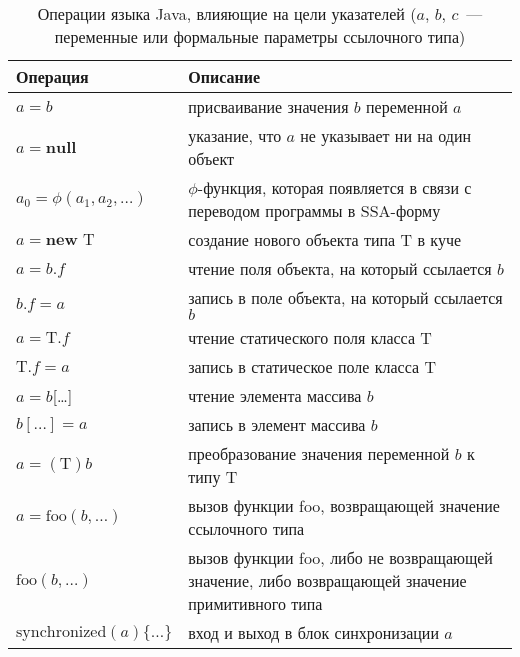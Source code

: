 \documentclass[14pt,titlepage]{extarticle}
\newcommand{\NEW}{\textbf{new }}
\newcommand{\NULL}{\textbf{null }}
\let\oldphi\phi
\renewcommand{\phi}{\ensuremath{\oldphi}}
\newcommand{\eng}[1]{{\English#1}}
\newcommand{\java}{\eng{Java}\xspace}
\begin{document}
      \begin{table}
        \centering

        \begin{tabular}{|l|p{}|}\hline
          \textbf{Операция} & \textbf{Описание}\\ \hline

          $a = b$
          & присваивание значения $b$ переменной $a$ \\ \hline

          $a = \NULL$
          & указание, что $a$ не указывает ни на один объект \\ \hline

          $a_0 = \phi(a_1, a_2, \ldots)$
          & \phi-функция, которая появляется в связи с переводом программы в
            SSA-форму \\ \hline

          $a = \NEW \textrm{T}$
          & создание нового объекта типа $\textrm{T}$ в куче \\ \hline

          $a = b.f$
          & чтение поля объекта, на который ссылается $b$ \\ \hline

          $b.f = a$
          & запись в поле объекта, на который ссылается $b$ \\ \hline

          $a = \textrm{T}.f$
          & чтение статического поля класса $\textrm{T}$ \\ \hline

          $\textrm{T}.f = a$
          & запись в статическое поле класса $\textrm{T}$ \\ \hline

          $a = b$[\ldots]
          & чтение элемента массива $b$ \\ \hline

          $b[\ldots] = a$
          & запись в элемент массива $b$ \\ \hline

          $a = (\textrm{T})b$
          & преобразование значения переменной $b$ к типу $\textrm{T}$ \\ \hline

          $a = \textrm{foo}(b, \ldots)$
          & вызов функции foo, возвращающей значение ссылочного типа \\ \hline

          $\textrm{foo}(b, \ldots)$
          & вызов функции foo, либо не возвращающей значение, либо возвращающей
            значение примитивного типа \\ \hline

          $\textrm{synchronized}(a) \{\ldots\}$
          & вход и выход в блок синхронизации $a$ \\ \hline
        \end{tabular}
        \caption{Операции языка \java, влияющие на цели указателей
                 ($a$, $b$, $c$~--- переменные или формальные параметры
                 ссылочного типа)}
        \label{tabular:operations}
      \end{table}
\end{document}
